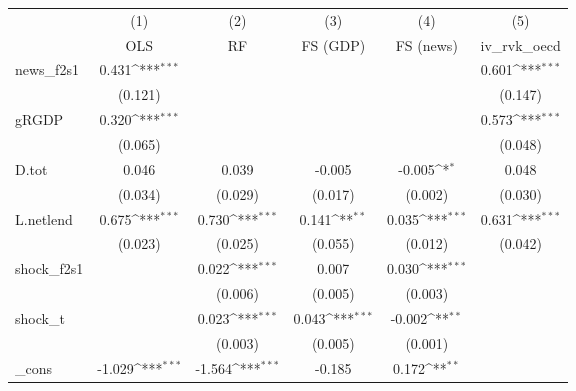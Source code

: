 {
\def\sym#1{\ifmmode^{#1}\else\(^{#1}\)\fi}
\begin{tabular}{l*{5}{c}}
\toprule
            &\multicolumn{1}{c}{(1)}&\multicolumn{1}{c}{(2)}&\multicolumn{1}{c}{(3)}&\multicolumn{1}{c}{(4)}&\multicolumn{1}{c}{(5)}\\
            &\multicolumn{1}{c}{OLS}&\multicolumn{1}{c}{RF}&\multicolumn{1}{c}{FS (GDP)}&\multicolumn{1}{c}{FS (news)}&\multicolumn{1}{c}{iv\_rvk\_oecd}\\
\midrule
news\_f2s1   &       0.431\sym{***}&                     &                     &                     &       0.601\sym{***}\\
            &     (0.121)         &                     &                     &                     &     (0.147)         \\
\addlinespace
gRGDP       &       0.320\sym{***}&                     &                     &                     &       0.573\sym{***}\\
            &     (0.065)         &                     &                     &                     &     (0.048)         \\
\addlinespace
D.tot       &       0.046         &       0.039         &      -0.005         &      -0.005\sym{*}  &       0.048         \\
            &     (0.034)         &     (0.029)         &     (0.017)         &     (0.002)         &     (0.030)         \\
\addlinespace
L.netlend   &       0.675\sym{***}&       0.730\sym{***}&       0.141\sym{**} &       0.035\sym{***}&       0.631\sym{***}\\
            &     (0.023)         &     (0.025)         &     (0.055)         &     (0.012)         &     (0.042)         \\
\addlinespace
shock\_f2s1  &                     &       0.022\sym{***}&       0.007         &       0.030\sym{***}&                     \\
            &                     &     (0.006)         &     (0.005)         &     (0.003)         &                     \\
\addlinespace
shock\_t     &                     &       0.023\sym{***}&       0.043\sym{***}&      -0.002\sym{**} &                     \\
            &                     &     (0.003)         &     (0.005)         &     (0.001)         &                     \\
\addlinespace
\_cons      &      -1.029\sym{***}&      -1.564\sym{***}&      -0.185         &       0.172\sym{**} &                     \\

\end{tabular}}
